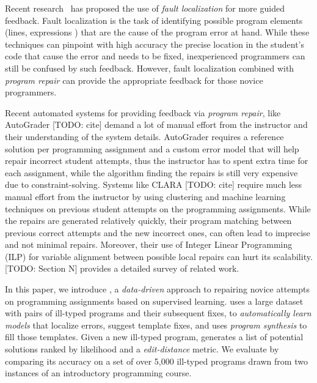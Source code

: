 Recent research~\citep[][]{Seidel:2017, Zhang2014-lv} has proposed the use of
\emph{fault localization} for more guided feedback. Fault localization is the
task of identifying possible program elements (\eg lines, expressions \etc) that
are the cause of the program error at hand. While these techniques can pinpoint
with high accuracy the precise location in the student's code that cause the
error and needs to be fixed, inexperienced programmers can still be confused by
such feedback. However, fault localization combined with \emph{program repair}
can provide the appropriate feedback for those novice programmers.

Recent automated systems for providing feedback via \emph{program repair}, like
AutoGrader [TODO: cite] demand a lot of manual effort from the instructor and
their understanding of the system details. AutoGrader requires a reference
solution per programming assignment and a custom error model that will help
repair incorrect student attempts, thus the instructor has to spent extra time
for each assignment, while the algorithm finding the repairs is still very
expensive due to constraint-solving. Systems like CLARA [TODO: cite] require
much less manual effort from the instructor by using clustering and machine
learning techniques on previous student attempts on the programming assignments.
While the repairs are generated relatively quickly, their program matching
between previous correct attempts and the new incorrect ones, can often lead to
imprecise and not minimal repairs. Moreover, their use of Integer Linear
Programming (ILP) for variable alignment between possible local repairs can hurt
its scalability. [TODO: Section N] provides a detailed survey of related work.

In this paper, we introduce \toolname, a \emph{data-driven} approach to
repairing novice attempts on programming assignments based on supervised
learning. \toolname uses a large dataset with pairs of ill-typed programs and
their subsequent fixes, to \emph{automatically learn models} that localize
errors, suggest template fixes, and uses \emph{program synthesis} to fill those
templates. Given a new ill-typed program, \toolname generates a list of
potential solutions ranked by likelihood and a \emph{edit-distance} metric. We
evaluate \toolname by comparing its accuracy on a set of over 5,000 ill-typed
\ocaml programs drawn from two instances of an introductory programming course.


